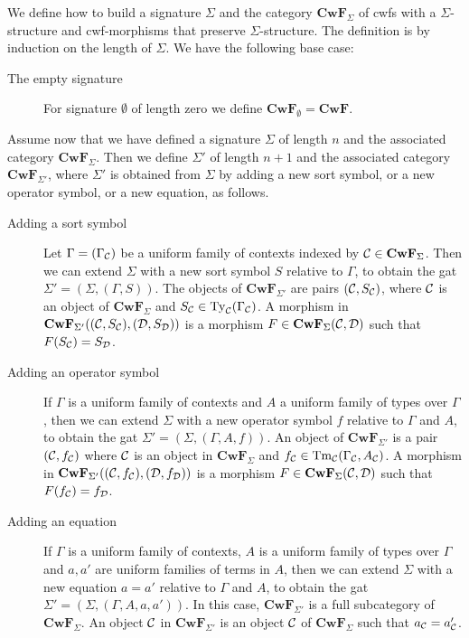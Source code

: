 \documentclass{lmcs}
\def\D{\mathcal{D}}
\def\Cwf{\mathbf{CwF}}
\begin{document}
\begin{definition}\label{def-sig-mod}
We define how to build a signature $\Sigma$ and the category $\Cwf_\Sigma$ of cwfs with a $\Sigma$-structure and cwf-morphisms that preserve $\Sigma$-structure. The definition is by induction on the length of $\Sigma$. We have the following base case:
\begin{description}
\item[The empty signature] For signature $\emptyset$ of length zero we define $\Cwf_\emptyset = \Cwf$.
\end{description}
Assume now that we have defined a signature $\Sigma$ of length $n$ and the associated
category $\Cwf_{\Sigma}$.
Then we define $\Sigma'$ of length $n+1$ and the associated category $\Cwf_{\Sigma'}$, where $\Sigma'$ is obtained from $\Sigma$ by adding a new sort symbol, or a new operator symbol, or a new equation, as follows.
\begin{description}
\item[Adding a sort symbol]
  Let $\Gamma = (\Gamma_{\mathcal C})$ be a uniform family of contexts indexed by $\C \in \Cwf_{\Sigma}$.
  Then we can extend $\Sigma$ with a new sort symbol $S$ relative to $\Gamma$, to obtain
  the gat $\Sigma' = (\Sigma,(\Gamma,S))$.
  The objects of $\Cwf_{\Sigma'}$ are pairs $({\mathcal C},S_{{\mathcal C}})$, where ${\mathcal C}$ is an object of $\Cwf_{\Sigma}$
  and $S_{{\mathcal C}} \in \mathrm{Ty}_{\mathcal C}(\Gamma_{{\mathcal C}})$.
  A morphism in $\Cwf_{\Sigma'}((\C,S_{\C}), (\D,S_{\D}))$
  is a morphism $F \in \Cwf_{\Sigma}(\C,\D)$ such that $F(S_\C) = S_\D$.
\item[Adding an operator symbol]
  If $\Gamma$ is a uniform family of contexts and $A$ a uniform family of
  types over $\Gamma$,
  then we can extend $\Sigma$ with a new operator
  symbol $f$ relative to $\Gamma$ and $A$, to obtain
  the gat $\Sigma' = (\Sigma,(\Gamma,A,f))$.
  An object of $\Cwf_{\Sigma'}$
  is a pair $({\mathcal C},f_{{\mathcal C}})$ where ${\mathcal C}$ is an object in $\Cwf_{\Sigma}$ and $f_{{\mathcal C}} \in \mathrm{Tm}_{\mathcal C}(\Gamma_{\mathcal C},A_{\mathcal C})$.
  A morphism in $\Cwf_{\Sigma'}((\C,f_{\C}),(\D,f_{\D}))$ is a morphism $F \in \Cwf_{\Sigma}(\C,\D)$ such that $F(f_{\C}) = f_{\D}$.
\item[Adding an equation]
  If $\Gamma$ is a uniform family of contexts,
  $A$ is a uniform family of types over $\Gamma$
  and $a,a'$ are uniform families of terms in $A$,
  then we can extend $\Sigma$ with a new equation $a = a'$ relative to $\Gamma$ and $A$, to obtain
  the gat $\Sigma' = (\Sigma,(\Gamma,A,a,a'))$.
  In this case,
  $\Cwf_{\Sigma'}$ is a full subcategory of $\Cwf_{\Sigma}$. An object ${\mathcal C}$ in
  $\Cwf_{\Sigma'}$ is an object ${\mathcal C}$ of $\Cwf_\Sigma$ such that $a_{{\mathcal C}} = a'_{{\mathcal C}}$.
\end{description}

\end{definition}
\end{document}
